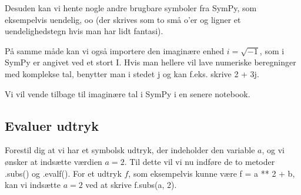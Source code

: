 \documentclass[letterpaper,10pt,english]{jupyterBook}
\begin{document}
\noindent{}

Desuden kan vi hente nogle andre brugbare symboler fra SymPy, som eksempelvis uendelig, oo (der skrives som to små o’er og ligner et uendelighedstegn hvis man har lidt fantasi).

\begin{sphinxVerbatim}[commandchars=\\\{\}]
    
                 
\end{sphinxVerbatim}

\noindent{}

På samme måde kan vi også importere den imaginære enhed \(i = \sqrt{-1}\), som i SymPy er angivet ved et stort I. Hvis man hellere vil lave numeriske beregninger med komplekse tal, benytter man i stedet j og kan f.eks. skrive 2 + 3j. 

\begin{sphinxVerbatim}[commandchars=\\\{\}]
    
             
      
        
\end{sphinxVerbatim}

\noindent{}

\noindent{}

Vi vil vende tilbage til imaginære tal i SymPy i en senere notebook.


\subsection{Evaluer udtryk}
\label{\detokenize{notebooks/sympy/Notebook2:evaluer-udtryk}}
Forestil dig at vi har et symbolsk udtryk, der indeholder den variable \(a\), og vi ønsker at indsætte værdien \(a = 2\). Til dette vil vi nu indføre de to metoder .subs() og .evalf(). For et udtryk \(f\), som eksempelvis kunne være f = a ** 2 + b, kan vi indsætte \(a = 2\) ved at skrive f.subs(a, 2).
\end{document}
